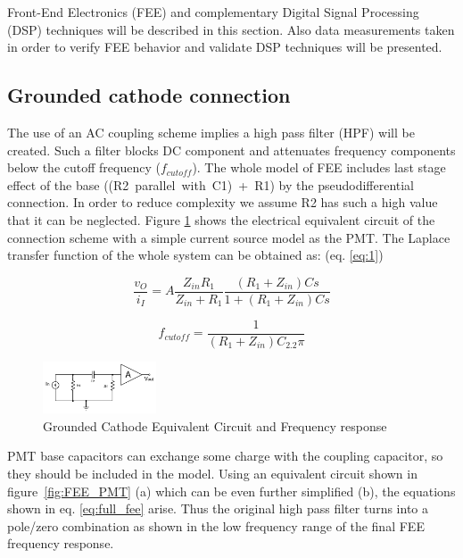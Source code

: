 \documentclass[a4paper, 10pt, oneside, twocolumn, 3p]{elsarticle}
\begin{document}
\par Front-End Electronics (FEE) and complementary Digital Signal Processing (DSP) techniques will be described in this section. Also data measurements taken in order to verify FEE behavior and validate DSP techniques will be presented. 


\subsection{Grounded cathode connection}

\par The use of an AC coupling scheme implies a high pass filter (HPF) will be created. Such a filter blocks DC component and attenuates frequency components below the cutoff frequency ($f_{cutoff}$). The whole model of FEE includes last stage effect of the base \mbox{((R2 parallel with C1) + R1)} by the pseudodifferential connection. In order to reduce complexity we assume R2 has such a high value that it can be neglected. Figure \ref{fig:GC_equivalent_circuit} shows the electrical equivalent circuit of the connection scheme with a simple current source model as the PMT. The Laplace transfer function of the whole system can be obtained as: (eq. \ref{eq:1})

\begin{equation}
\frac{v_O}{i_I}=A\frac{Z_{in}R_1}{Z_{in}+R_1}\frac{(R_1+Z_{in})Cs}{1+(R_1+Z_{in})Cs}
\label{eq:1}
\end{equation}

\begin{equation}
f_{cutoff}=\frac{1}{(R_1+Z_{in})C_2.2\pi}
\end{equation}


\begin{figure}
	\begin{center}
		\includegraphics[width=0.3\textwidth]{./figures/FEE_simple.png}
	\end{center}
	\caption{Grounded Cathode Equivalent Circuit and Frequency response}
	\label{fig:GC_equivalent_circuit}
\end{figure}


PMT base capacitors can exchange some charge with the coupling capacitor, so they should be included in the model. Using an equivalent circuit shown in figure~\ref{fig:FEE_PMT} (a) which can be even further simplified (b), the equations shown in eq. \ref{eq:full_fee} arise. Thus the original high pass filter turns into a pole/zero combination as shown in the low frequency range of the final FEE frequency response.
\end{document}
